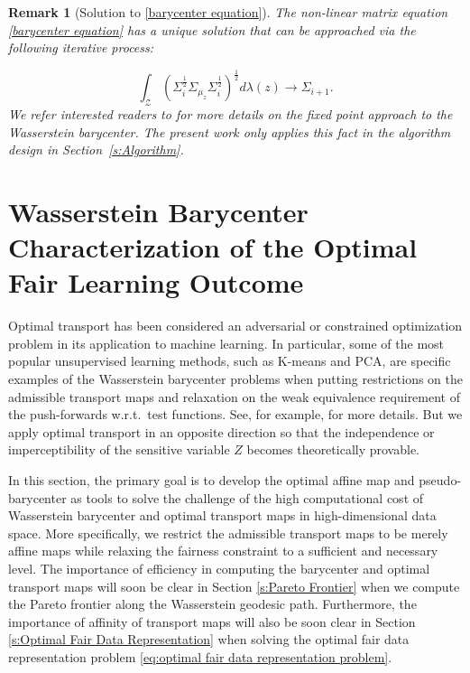 \documentclass[twoside,11pt]{article}
\newtheorem{rema}{Remark}[section]{\bfseries}{\itshape}
\begin{document}
\begin{rema}[Solution to \eqref{barycenter equation}] \label{r:solution to baryceneter equation}
The non-linear matrix equation \eqref{barycenter equation} has a unique solution that can be approached via the following iterative process:

\begin{equation} \label{eq:iterative method}
\int_{\mathcal{Z}} (\Sigma_i^{\frac{1}{2}} \Sigma_{\mu_z} \Sigma_i^{\frac{1}{2}})^{\frac{1}{2}} d\lambda(z) \rightarrow \Sigma_{i+1}.
\end{equation}
We refer interested readers to \cite{alvarez2016fixed} for more details on the fixed point approach to the Wasserstein barycenter. The present work only applies this fact in the algorithm design in Section~\ref{s:Algorithm}.
\end{rema}

\section{Wasserstein Barycenter Characterization of the Optimal Fair Learning Outcome} \label{s:Post-Processing}

Optimal transport has been considered an adversarial or constrained optimization problem in its application to machine learning. In particular, some of the most popular unsupervised learning methods, such as K-means and PCA, are specific examples of the Wasserstein barycenter problems when putting restrictions on the admissible transport maps and relaxation on the weak equivalence requirement of the push-forwards w.r.t.\ test functions. See, for example, \cite{tabak2018explanation} for more details. But we apply optimal transport in an opposite direction so that the independence or imperceptibility of the sensitive variable $Z$ becomes theoretically provable.

In this section, the primary goal is to develop the optimal affine map and pseudo-barycenter as tools to solve the challenge of the high computational cost of Wasserstein barycenter and optimal transport maps in high-dimensional data space. More specifically, we restrict the admissible transport maps to be merely affine maps while relaxing the fairness constraint to a sufficient and necessary level. The importance of efficiency in computing the barycenter and optimal transport maps will soon be clear in Section \ref{s:Pareto Frontier} when we compute the Pareto frontier along the Wasserstein geodesic path. Furthermore, the importance of affinity of transport maps will also be soon clear in Section \ref{s:Optimal Fair Data Representation} when solving the optimal fair data representation problem \eqref{eq:optimal fair data representation problem}.
\end{document}
